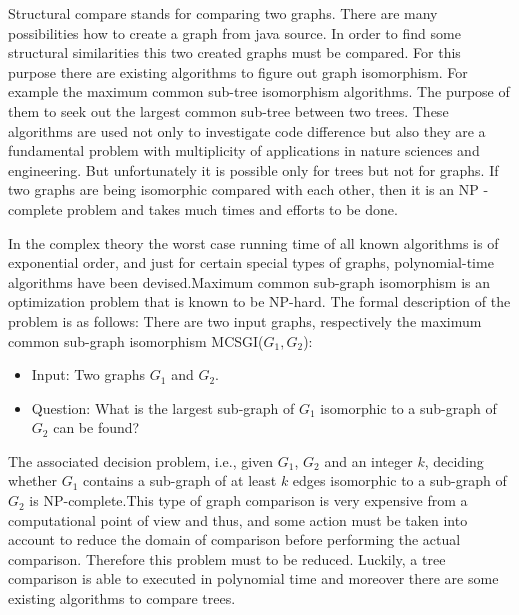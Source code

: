 \documentclass{report}
\begin{document}
Structural compare stands for comparing two graphs. There are many possibilities how to create a graph from java source. In order to find some structural similarities this two created graphs must be compared. For this purpose there are existing algorithms to figure out graph isomorphism. For example the maximum common sub-tree isomorphism algorithms. The purpose of them to seek out the largest common sub-tree between two trees. These algorithms are used not only to investigate code difference but also they are a fundamental problem with multiplicity of applications in nature sciences and engineering.
But unfortunately it is possible only for trees but not for graphs. If two graphs are being isomorphic compared with each other, then it is an NP - complete problem and takes much times and efforts to be done. 

In the complex theory the worst case running time of all known algorithms is of exponential order, and just for certain special types of graphs, polynomial-time algorithms have been devised\cite{graph_isomorphism_is}.Maximum common sub-graph isomorphism is an optimization problem that is known to be NP-hard. The formal description of the problem is as follows:
There are two input graphs, respectively the maximum common sub-graph isomorphism MCSGI($ G_{1}, G_{2}$):

\begin{itemize}
	\item     Input: Two graphs $ G_{1}$ and $G_{2}$.
	\item     Question: What is the largest sub-graph of  $ G_{1}$ isomorphic to a sub-graph of  $ G_{2}$ can be found?
\end{itemize}

The associated decision problem, i.e., given $ G_{1}$, $ G_{2}$ and an integer $k$, deciding whether $ G_{1}$ contains a sub-graph of at least $k$ edges isomorphic to a sub-graph of $ G_{2}$ is NP-complete\cite{graph_isomorphism_is}.This type of graph comparison is very expensive from a computational point of view and thus, and some action must be taken into account to reduce the domain of comparison before performing the actual comparison. Therefore this problem must to be reduced. Luckily, a tree comparison is able to executed in polynomial time and moreover there are some existing algorithms to compare trees.
\end{document}
